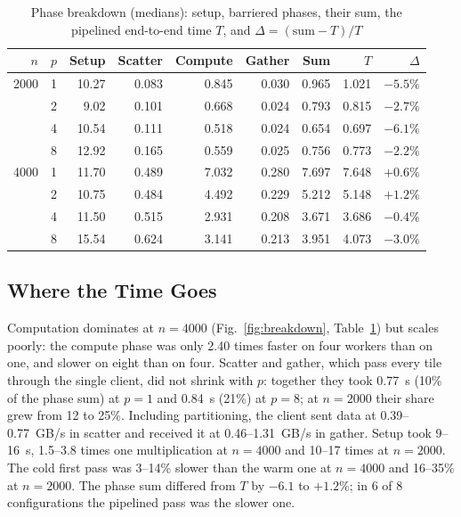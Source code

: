 \documentclass[conference,a4paper]{IEEEtran}
\begin{document}
\begin{table}[t]
  \centering
  \caption{Phase breakdown (medians): setup, barriered phases, their sum, the
           pipelined end-to-end time $T$, and $\Delta = (\text{sum} - T)/T$}
  \label{tab:phases}
  \footnotesize
  \setlength{\tabcolsep}{3.1pt}
  \begin{tabular}{@{}rrrrrrrrr@{}}
    \toprule
    $n$ & $p$ & Setup & Scatter & Compute & Gather & Sum & $T$ & $\Delta$ \\
    \midrule
    2000 & 1 & 10.27 & 0.083 & 0.845 & 0.030 & 0.965 & 1.021 & $-5.5\%$ \\
         & 2 &  9.02 & 0.101 & 0.668 & 0.024 & 0.793 & 0.815 & $-2.7\%$ \\
         & 4 & 10.54 & 0.111 & 0.518 & 0.024 & 0.654 & 0.697 & $-6.1\%$ \\
         & 8 & 12.92 & 0.165 & 0.559 & 0.025 & 0.756 & 0.773 & $-2.2\%$ \\
    \midrule
    4000 & 1 & 11.70 & 0.489 & 7.032 & 0.280 & 7.697 & 7.648 & $+0.6\%$ \\
         & 2 & 10.75 & 0.484 & 4.492 & 0.229 & 5.212 & 5.148 & $+1.2\%$ \\
         & 4 & 11.50 & 0.515 & 2.931 & 0.208 & 3.671 & 3.686 & $-0.4\%$ \\
         & 8 & 15.54 & 0.624 & 3.141 & 0.213 & 3.951 & 4.073 & $-3.0\%$ \\
    \bottomrule
  \end{tabular}
\end{table}

\subsection{Where the Time Goes}
\label{sec:res-phases}

Computation dominates at $n = 4000$ (Fig.~\ref{fig:breakdown},
Table~\ref{tab:phases}) but scales poorly: the compute phase was only 2.40
times faster on four workers than on one, and slower on eight than on four. Scatter and gather, which pass every tile through the
single client, did not shrink with $p$: together they took 0.77~s (10\% of the
phase sum) at $p = 1$ and 0.84~s (21\%) at $p = 8$; at $n = 2000$ their share
grew from 12 to 25\%. Including partitioning, the client sent data at
0.39--0.77~GB/s in scatter and received it at 0.46--1.31~GB/s in gather. Setup took 9--16~s, 1.5--3.8 times one
multiplication at $n = 4000$ and 10--17 times at $n = 2000$. The cold first pass
was 3--14\% slower than the warm one at $n = 4000$ and 16--35\% at $n = 2000$.
The phase sum differed from $T$ by $-6.1$ to $+1.2\%$; in 6 of 8
configurations the pipelined pass was the slower one.
\end{document}
